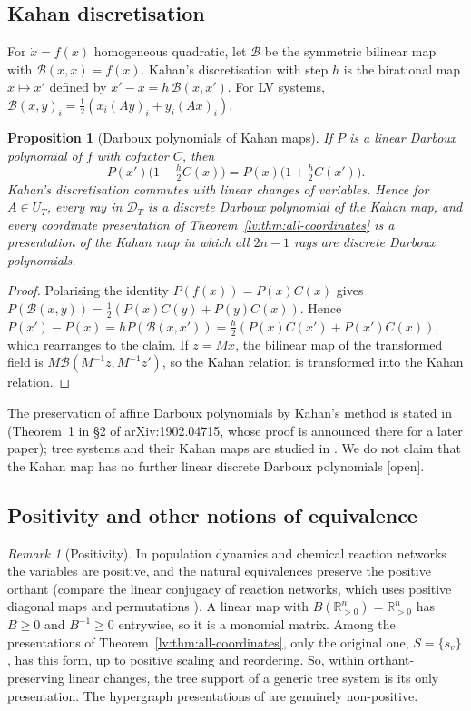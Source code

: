 \documentclass[11pt,a4paper]{article}
\newtheorem{proposition}[theorem]{Proposition}
\theoremstyle{definition}
\theoremstyle{remark}
\newtheorem{remark}[theorem]{Remark}
\newcommand{\lab}[1]{\textsf{[#1]}}
\begin{document}
\subsection{Kahan discretisation}

For $\dot x=f(x)$ homogeneous quadratic, let $\mathcal B$ be the symmetric bilinear map with $\mathcal B(x,x)=f(x)$. Kahan's discretisation with step $h$ \cite{lv:Kahan,lv:KahanLi1997,lv:CMOQ2013} is the birational map $x\mapsto x'$ defined by $x'-x=h\,\mathcal B(x,x')$. For LV systems, $\mathcal B(x,y)_i=\tfrac12(x_i(Ay)_i+y_i(Ax)_i)$.

\begin{proposition}[Darboux polynomials of Kahan maps]
\label{lv:prop:kahan}
If $P$ is a linear Darboux polynomial of $f$ with cofactor $C$, then
\[
 P(x')\bigl(1-\tfrac h2C(x)\bigr)=P(x)\bigl(1+\tfrac h2C(x')\bigr).
\]
Kahan's discretisation commutes with linear changes of variables. Hence for $A\in U_T$, every ray in $\mathcal D_T$ is a discrete Darboux polynomial of the Kahan map, and every coordinate presentation of Theorem~\ref{lv:thm:all-coordinates} is a presentation of the Kahan map in which all $2n-1$ rays are discrete Darboux polynomials.
\end{proposition}

\begin{proof}
Polarising the identity $P(f(x))=P(x)C(x)$ gives $P(\mathcal B(x,y))=\tfrac12(P(x)C(y)+P(y)C(x))$. Hence $P(x')-P(x)=hP(\mathcal B(x,x'))=\tfrac h2(P(x)C(x')+P(x')C(x))$, which rearranges to the claim. If $z=Mx$, the bilinear map of the transformed field is $M\mathcal B(M^{-1}z,M^{-1}z')$, so the Kahan relation is transformed into the Kahan relation.
\end{proof}

The preservation of affine Darboux polynomials by Kahan's method is stated in \cite{lv:CEMOQTK2019} (Theorem~1 in \S2 of arXiv:1902.04715, whose proof is announced there for a later paper); tree systems and their Kahan maps are studied in \cite{lv:QTMK2023b}. We do not claim that the Kahan map has no further linear discrete Darboux polynomials \lab{open}.

\subsection{Positivity and other notions of equivalence}

\begin{remark}[Positivity]
\label{lv:rem:positivity}
In population dynamics and chemical reaction networks the variables are positive, and the natural equivalences preserve the positive orthant (compare the linear conjugacy of reaction networks, which uses positive diagonal maps and permutations \cite{lv:JS2011}). A linear map with $B(\mathbb R^n_{>0})=\mathbb R^n_{>0}$ has $B\geq0$ and $B^{-1}\geq0$ entrywise, so it is a monomial matrix. Among the presentations of Theorem~\ref{lv:thm:all-coordinates}, only the original one, $S=\{s_v\}$, has this form, up to positive scaling and reordering. So, within orthant-preserving linear changes, the tree support of a generic tree system is its only presentation. The hypergraph presentations of \cite{lv:K2025} are genuinely non-positive.
\end{remark}
\end{document}
